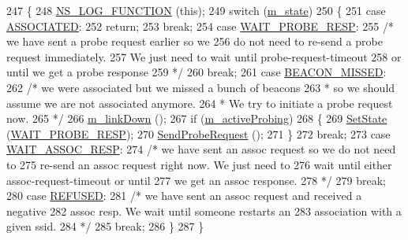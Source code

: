 \begin{DoxyCode}
247 \{
248   \hyperlink{log-macros-disabled_8h_a90b90d5bad1f39cb1b64923ea94c0761}{NS\_LOG\_FUNCTION} (\textcolor{keyword}{this});
249   \textcolor{keywordflow}{switch} (\hyperlink{classns3_1_1StaWifiMac_aa5739fb8521d45d18509f066b6872e66}{m\_state})
250     \{
251     \textcolor{keywordflow}{case} \hyperlink{classns3_1_1StaWifiMac_a262848fcb2046037198bd36fa86fbd2caa06dbd19272a71d7f2286202085f5f9f}{ASSOCIATED}:
252       \textcolor{keywordflow}{return};
253       \textcolor{keywordflow}{break};
254     \textcolor{keywordflow}{case} \hyperlink{classns3_1_1StaWifiMac_a262848fcb2046037198bd36fa86fbd2ca2cc58d1d1fd2ffb7cbf772e2ae606f13}{WAIT\_PROBE\_RESP}:
255       \textcolor{comment}{/* we have sent a probe request earlier so we}
256 \textcolor{comment}{         do not need to re-send a probe request immediately.}
257 \textcolor{comment}{         We just need to wait until probe-request-timeout}
258 \textcolor{comment}{         or until we get a probe response}
259 \textcolor{comment}{       */}
260       \textcolor{keywordflow}{break};
261     \textcolor{keywordflow}{case} \hyperlink{classns3_1_1StaWifiMac_a262848fcb2046037198bd36fa86fbd2cab6195e8c7a4f7920400d51b3bc5e69b7}{BEACON\_MISSED}:
262       \textcolor{comment}{/* we were associated but we missed a bunch of beacons}
263 \textcolor{comment}{       * so we should assume we are not associated anymore.}
264 \textcolor{comment}{       * We try to initiate a probe request now.}
265 \textcolor{comment}{       */}
266       \hyperlink{classns3_1_1RegularWifiMac_a4951247f850b30e1367565ebeb2999e5}{m\_linkDown} ();
267       \textcolor{keywordflow}{if} (\hyperlink{classns3_1_1StaWifiMac_a0bfa3d83212fbf876124763adb7b22cf}{m\_activeProbing})
268         \{
269           \hyperlink{classns3_1_1StaWifiMac_a1253ad1bd7821a1aedab2a7c847993b9}{SetState} (\hyperlink{classns3_1_1StaWifiMac_a262848fcb2046037198bd36fa86fbd2ca2cc58d1d1fd2ffb7cbf772e2ae606f13}{WAIT\_PROBE\_RESP});
270           \hyperlink{classns3_1_1StaWifiMac_a2280584632094368d217112ceb2c4e44}{SendProbeRequest} ();
271         \}
272       \textcolor{keywordflow}{break};
273     \textcolor{keywordflow}{case} \hyperlink{classns3_1_1StaWifiMac_a262848fcb2046037198bd36fa86fbd2cae21481c68081ea41e6ea065623ecc48b}{WAIT\_ASSOC\_RESP}:
274       \textcolor{comment}{/* we have sent an assoc request so we do not need to}
275 \textcolor{comment}{         re-send an assoc request right now. We just need to}
276 \textcolor{comment}{         wait until either assoc-request-timeout or until}
277 \textcolor{comment}{         we get an assoc response.}
278 \textcolor{comment}{       */}
279       \textcolor{keywordflow}{break};
280     \textcolor{keywordflow}{case} \hyperlink{classns3_1_1StaWifiMac_a262848fcb2046037198bd36fa86fbd2caa29ebdf6163b78af500f1af4deba143a}{REFUSED}:
281       \textcolor{comment}{/* we have sent an assoc request and received a negative}
282 \textcolor{comment}{         assoc resp. We wait until someone restarts an}
283 \textcolor{comment}{         association with a given ssid.}
284 \textcolor{comment}{       */}
285       \textcolor{keywordflow}{break};
286     \}
287 \}
\end{DoxyCode}


